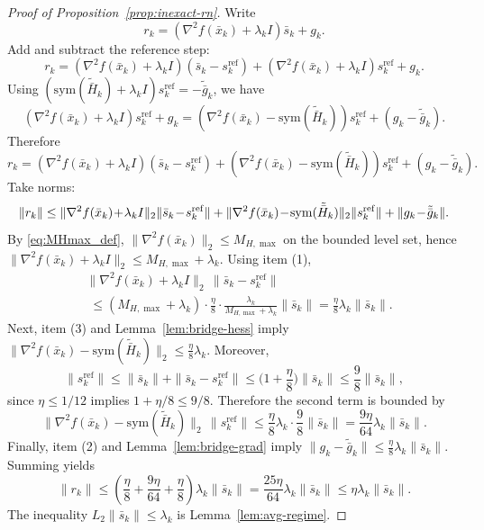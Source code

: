 \documentclass[10pt,twocolumn,letterpaper]{article}
\theoremstyle{compact}
\theoremstyle{compactremark}
\begin{document}
\begin{proof}[Proof of Proposition~\ref{prop:inexact-rn}]
Write
\[
r_k=(\nabla^2 f(\bar x_k)+\lambda_k I)\bar s_k+g_k.
\]
Add and subtract the reference step:
\[
r_k=(\nabla^2 f(\bar x_k)+\lambda_k I)(\bar s_k-s_k^{\mathrm{ref}})
+(\nabla^2 f(\bar x_k)+\lambda_k I)s_k^{\mathrm{ref}}+g_k.
\]
Using $(\mathrm{sym}(\tilde{\bar H}_k)+\lambda_k I)s_k^{\mathrm{ref}}=-\tilde{\bar g}_k$, we have
\[
(\nabla^2 f(\bar x_k)+\lambda_k I)s_k^{\mathrm{ref}}+g_k
=(\nabla^2 f(\bar x_k)-\mathrm{sym}(\tilde{\bar H}_k))s_k^{\mathrm{ref}}+(g_k-\tilde{\bar g}_k).
\]
Therefore
\[
r_k=(\nabla^2 f(\bar x_k)+\lambda_k I)(\bar s_k-s_k^{\mathrm{ref}})
+(\nabla^2 f(\bar x_k)-\mathrm{sym}(\tilde{\bar H}_k))s_k^{\mathrm{ref}}+(g_k-\tilde{\bar g}_k).
\]
Take norms:
\[
\|r_k\|
\le \|\nabla^2 f(\bar x_k)\!+\!\lambda_k I\|_2\|\bar s_k\!-\!s_k^{\mathrm{ref}}\|\\
+\|\nabla^2 f(\bar x_k)\!-\!\mathrm{sym}(\tilde{\bar H}_k)\|_2\|s_k^{\mathrm{ref}}\|
+\|g_k\!-\!\tilde{\bar g}_k\|.
\]
By \eqref{eq:MHmax_def}, $\|\nabla^2 f(\bar x_k)\|_2\le M_{H,\max}$ on the bounded level set, hence
$\|\nabla^2 f(\bar x_k)+\lambda_k I\|_2\le M_{H,\max}+\lambda_k$.
Using item (1),
\begin{align*}
&\|\nabla^2 f(\bar x_k)\!+\!\lambda_k I\|_2\,\|\bar s_k\!-\!s_k^{\mathrm{ref}}\|\\
&\;\le (M_{H,\max}\!+\!\lambda_k)\!\cdot\!\tfrac{\eta}{8}\!\cdot\!\tfrac{\lambda_k}{M_{H,\max}+\lambda_k}\|\bar s_k\|
=\tfrac{\eta}{8}\lambda_k\|\bar s_k\|.
\end{align*}
Next, item (3) and Lemma~\ref{lem:bridge-hess} imply
$\|\nabla^2 f(\bar x_k)-\mathrm{sym}(\tilde{\bar H}_k)\|_2\le \frac{\eta}{8}\lambda_k$.
Moreover,
\[
\|s_k^{\mathrm{ref}}\|\le \|\bar s_k\|+\|\bar s_k-s_k^{\mathrm{ref}}\|
\le \Big(1+\frac{\eta}{8}\Big)\|\bar s_k\|\le \frac98\|\bar s_k\|,
\]
since $\eta\le 1/12$ implies $1+\eta/8\le 9/8$.
Therefore the second term is bounded by
\[
\|\nabla^2 f(\bar x_k)-\mathrm{sym}(\tilde{\bar H}_k)\|_2\,\|s_k^{\mathrm{ref}}\|
\le \frac{\eta}{8}\lambda_k\cdot \frac98\|\bar s_k\|=\frac{9\eta}{64}\lambda_k\|\bar s_k\|.
\]
Finally, item (2) and Lemma~\ref{lem:bridge-grad} imply $\|g_k-\tilde{\bar g}_k\|\le \frac{\eta}{8}\lambda_k\|\bar s_k\|$.
Summing yields
\[
\|r_k\|\le \left(\frac{\eta}{8}+\frac{9\eta}{64}+\frac{\eta}{8}\right)\lambda_k\|\bar s_k\|
=\frac{25\eta}{64}\lambda_k\|\bar s_k\|\le \eta\lambda_k\|\bar s_k\|.
\]
The inequality $L_2\|\bar s_k\|\le \lambda_k$ is Lemma~\ref{lem:avg-regime}.
\end{proof}
\end{document}
